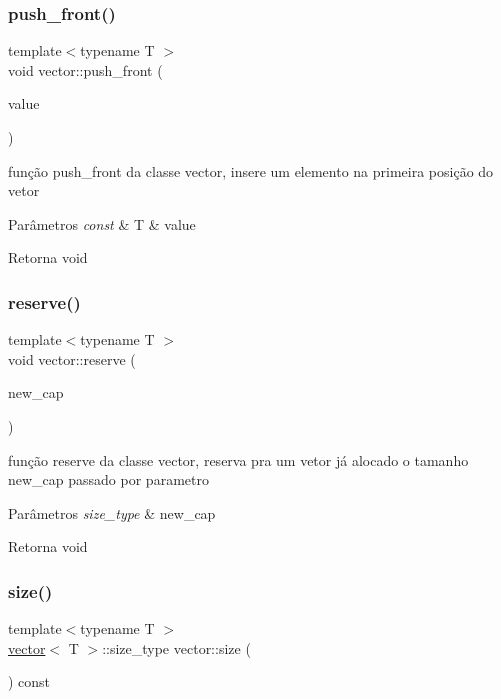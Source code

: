 \subsubsection{\texorpdfstring{push\+\_\+front()}{push\_front()}}
{\footnotesize\ttfamily template$<$typename T $>$ \\
void vector\+::push\+\_\+front (\begin{DoxyParamCaption}\item[{const T \&}]{value }\end{DoxyParamCaption})}

função push\+\_\+front da classe vector, insere um elemento na primeira posição do vetor 
\begin{DoxyParams}{Parâmetros}
{\em const} & T \& value \\
\hline
\end{DoxyParams}
\begin{DoxyReturn}{Retorna}
void 
\end{DoxyReturn}
\mbox{\label{classsc_1_1vector_ab3f182ffcff81ba14ecfcc9e53711496}} 
\subsubsection{\texorpdfstring{reserve()}{reserve()}}
{\footnotesize\ttfamily template$<$typename T $>$ \\
void vector\+::reserve (\begin{DoxyParamCaption}\item[{size\+\_\+type}]{new\+\_\+cap }\end{DoxyParamCaption})}

função reserve da classe vector, reserva pra um vetor já alocado o tamanho new\+\_\+cap passado por parametro 
\begin{DoxyParams}{Parâmetros}
{\em size\+\_\+type} & new\+\_\+cap \\
\hline
\end{DoxyParams}
\begin{DoxyReturn}{Retorna}
void 
\end{DoxyReturn}
\mbox{\label{classsc_1_1vector_afee521145d4c91a523a4ab3c605296a2}} 
\subsubsection{\texorpdfstring{size()}{size()}}
{\footnotesize\ttfamily template$<$typename T $>$ \\
\mbox{\hyperlink{classsc_1_1vector}{vector}}$<$ T $>$\+::size\+\_\+type vector\+::size (\begin{DoxyParamCaption}\item[{void}]{ }\end{DoxyParamCaption}) const}

